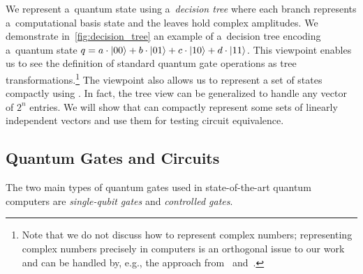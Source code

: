 We represent a~quantum state using a~\emph{decision tree} where
each branch represents a~computational basis state and the leaves hold
complex amplitudes. We demonstrate in~\cref{fig:decision_tree} an example of
a~decision tree encoding a~quantum state
$q=a\cdot\ket{00}+b\cdot\ket{01}+c\cdot\ket{10}+d\cdot\ket{11}$. This viewpoint
enables us to see the definition of standard quantum gate operations as tree
transformations.\footnote{Note that we do not discuss how to represent complex numbers; representing complex numbers precisely in computers is an
orthogonal issue to our work and can be handled by, e.g., the approach
from~\cite{ZulehnerW19} and~\cite{TsaiJJ21}.}
The viewpoint also allows us to represent a set of states compactly using \lstas.
In fact, the tree view can be generalized to handle any vector of $2^n$ entries.
We will show that \lstas can compactly represent some sets of linearly
independent vectors and use them for testing circuit equivalence.

\vspace{-0.0mm}
\subsection{Quantum Gates and Circuits}\label{sec:quantum_gates}
\vspace{-0.0mm}

The two main types of quantum gates used in state-of-the-art quantum computers are \emph{single-qubit gates} and \emph{controlled gates}. 

\vspace{-0.0mm}
